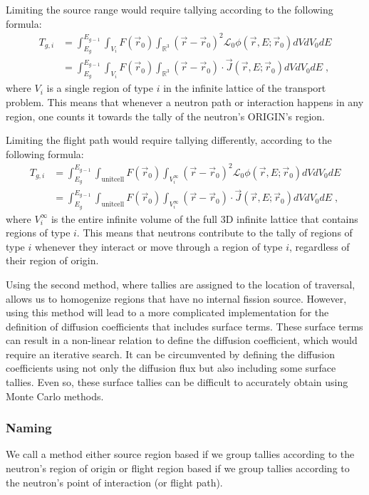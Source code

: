\documentclass[a4paper,letterpaper,12pt,oneside,draft]{article}
\newcommand{\eec}{\;,}
\newcommand{\OpL}{\mathscr{L}}
\newcommand{\allspace}{\ensuremath{\mathbb{R}^3}}
\newcommand{\intg}[2][g]{\ensuremath{\int_{E_{#1}}^{E_{#1-1}} #2 dE}}
\newcommand{\vr}{\ensuremath{\vec{r}}}
\newcommand{\dvr}{\left(\vr-\vr_0\right)}
\begin{document}
Limiting the source range would require tallying according to the following formula:
\begin{align}
    \nonumber
    T_{g,i} &= \intg{\int_{V_i}F(\vr_0)\int_{\allspace}\dvr^2\OpL_0\phi(\vr,E;\vr_0)dVdV_0} \\
    \label{eq:Tally:limitsource}
    &= \intg{\int_{V_i}F(\vr_0)\int_{\allspace}\dvr\cdot\vec{J}(\vr,E;\vr_0)dVdV_0} \eec
\end{align}
where $V_i$ is a single region of type $i$ in the infinite lattice of the transport problem.
This means that whenever a neutron path or interaction happens in any region, one counts it towards the tally of the neutron's ORIGIN's region.

Limiting the flight path would require tallying differently, according to the following formula:
\begin{align}
    \nonumber
    T_{g,i} &= \intg{\int_{\text{unitcell}}F(\vr_0)\int_{V_i^\infty} \dvr^2\OpL_0\phi(\vr,E;\vr_0)dVdV_0} \\
    \label{eq:Tally:limitflight}
    &= \intg{\int_{\text{unitcell}}F(\vr_0)\int_{V_i^\infty} \dvr\cdot\vec{J}(\vr,E;\vr_0)dVdV_0}\eec
\end{align}
where $V_i^\infty$ is the entire infinite volume of the full 3D infinite lattice that contains regions of type $i$.
This means that neutrons contribute to the tally of regions of type $i$ whenever they interact or move through a region of type $i$, regardless of their region of origin.

Using the second method, where tallies are assigned to the location of traversal, allows us to homogenize regions that have no internal fission source.
However, using this method will lead to a more complicated implementation for the definition of diffusion coefficients that includes surface terms.
These surface terms can result in a non-linear relation to define the diffusion coefficient, which would require an iterative search.
It can be circumvented by defining the diffusion coefficients using not only the diffusion flux but also including some surface tallies.
Even so, these surface tallies can be difficult to accurately obtain using Monte Carlo methods.

\subsubsection*{Naming}
We call a method either source region based if we group tallies according to the neutron's region of origin or flight region based if we group tallies according to the neutron's point of interaction (or flight path).
\end{document}
